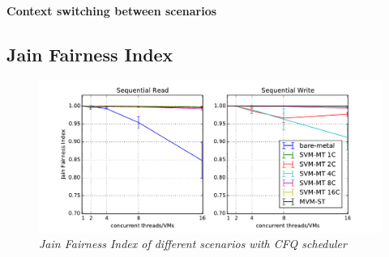 \documentclass{acmsig}
\begin{document}
\paragraph{Context switching between scenarios}

\subsection{Jain Fairness Index}
\begin{figure}[t]
  \includegraphics[scale=0.85]{figures/JFI.pdf}
  \caption{\textit{Jain Fairness Index of different scenarios with CFQ scheduler}}
  \label{fig:jfi}
\end{figure}







\end{document}
